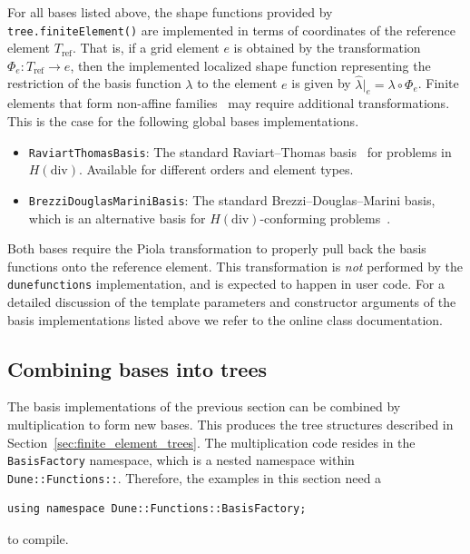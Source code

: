 \documentclass[a4paper,10pt,headings=normal,bibliography=totoc]{scrartcl}
\newcommand{\cpp}[1]{\lstinline[basicstyle=\ttfamily]!#1!}
\newcommand{\dunemodule}[1]{\texttt{#1}}
\begin{document}
For all bases listed above, the shape functions provided by
\cpp{tree.finiteElement()} are implemented in terms of coordinates of the reference
element $T_\text{ref}$. That is, if a grid element $e$ is obtained by the transformation
$\Phi_e: T_\text{ref} \to e$, then the implemented localized shape function
representing the restriction of the basis function $\lambda$ to the
element $e$ is given by $\hat{\lambda}|_e = \lambda\circ\Phi_e$.
Finite elements that form non-affine families~\cite{ciarlet:1978}
may require additional transformations. This is the case for the following global
bases implementations.

\begin{itemize}
 \item \cpp{RaviartThomasBasis}: The standard Raviart--Thomas basis~\cite{boffi_brezzi_fortin:2013}
  for problems in $H(\text{div})$.  Available for different orders and element types.

 \item \cpp{BrezziDouglasMariniBasis}: The standard Brezzi--Douglas--Marini basis, which is an
  alternative basis for $H(\text{div})$-conforming problems~\cite{boffi_brezzi_fortin:2013}.
\end{itemize}

Both bases require the Piola transformation to properly pull back the basis functions
onto the reference element.  This transformation is \emph{not} performed by the
\dunemodule{dune\-functions} implementation, and is expected to happen in user code.
For a detailed discussion of the template parameters and constructor arguments
of the basis implementations listed above we refer to the online class documentation.


\subsection{Combining bases into trees}
\label{sec:composed_bases}

The basis implementations of the previous section can be combined by multiplication to form new bases.
This produces the tree structures described in Section~\ref{sec:finite_element_trees}.
The multiplication code resides in the \cpp{BasisFactory} namespace, which is a nested namespace
within \cpp{Dune::Functions::}. Therefore, the examples in this section need a
\begin{lstlisting}[style=Example]
using namespace Dune::Functions::BasisFactory;
\end{lstlisting}
to compile.
\end{document}
